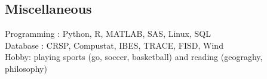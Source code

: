 \documentclass[margin]{res}
\begin{document}
\begin{resume}
\section{\sc Miscellaneous}

Programming : Python, R, MATLAB, SAS, Linux, SQL
\\
Database : CRSP, Compustat, IBES, TRACE, FISD, Wind
\\
Hobby: playing sports (go, soccer, basketball) and reading (geograghy, philosophy)



\end{resume}
\(\)
\end{document}

